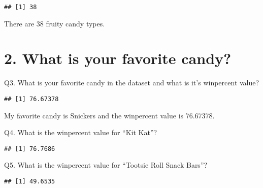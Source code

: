 \documentclass[
]{article}
\newenvironment{Shaded}{\begin{snugshade}}{\end{snugshade}}
\newcommand{\CommentTok}[1]{\textcolor[rgb]{0.56,0.35,0.01}{\textit{#1}}}
\newcommand{\DecValTok}[1]{\textcolor[rgb]{0.00,0.00,0.81}{#1}}
\newcommand{\NormalTok}[1]{#1}
\newcommand{\SpecialCharTok}[1]{\textcolor[rgb]{0.81,0.36,0.00}{\textbf{#1}}}
\begin{document}
\begin{verbatim}
## [1] 38
\end{verbatim}

There are 38 fruity candy types.

\hypertarget{what-is-your-favorite-candy}{%
\section{2. What is your favorite
candy?}\label{what-is-your-favorite-candy}}

Q3. What is your favorite candy in the dataset and what is it's
winpercent value?

\begin{Shaded}
\end{Shaded}

\begin{verbatim}
## [1] 76.67378
\end{verbatim}

My favorite candy is Snickers and the winpercent value is 76.67378.

Q4. What is the winpercent value for ``Kit Kat''?

\begin{Shaded}
\end{Shaded}

\begin{verbatim}
## [1] 76.7686
\end{verbatim}

Q5. What is the winpercent value for ``Tootsie Roll Snack Bars''?

\begin{Shaded}
\end{Shaded}

\begin{verbatim}
## [1] 49.6535
\end{verbatim}
\end{document}
